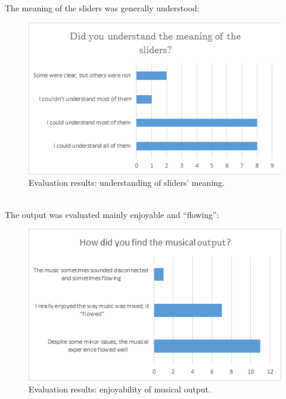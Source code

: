 The meaning of the sliders was generally understood:\\
\begin{figure}[h]
\begin{center}
\includegraphics[scale=0.5]{Figures/slidersmeaning.png}
  \caption[Evaluation results: understanding of sliders' meaning]{Evaluation results: understanding of sliders' meaning.}
\end{center}
\end{figure}
\\

The output was evaluated mainly enjoyable and ``flowing'': \\
\begin{figure}[h]
\begin{center}
\includegraphics[scale=0.5]{Figures/flow.png}
  \caption[Evaluation results: enjoyability of musical output]{Evaluation results: enjoyability of musical output.}
\end{center}
\end{figure}
\\

